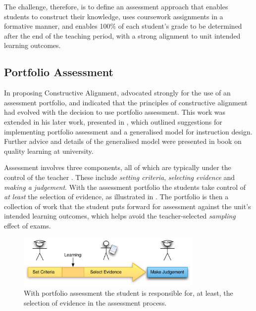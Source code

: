 The challenge, therefore, is to define an assessment approach that enables students to construct their knowledge, uses coursework assignments in a formative manner, and enables 100\% of each student's grade to be determined after the end of the teaching period, with a strong alignment to unit intended learning outcomes.

\clearpage
\subsection{Portfolio Assessment} %
\label{sub:portfolio_assessment}

In proposing Constructive Alignment, \citet{Biggs:1996c} advocated strongly for the use of an assessment portfolio, and indicated that the principles of constructive alignment had evolved with the decision to use portfolio assessment. This work was extended in his later work, presented in \cite{Biggs:1997}, which outlined suggestions for implementing portfolio assessment and a generalised model for instruction design. Further advice and details of the generalised model were presented in \citet{Biggs:2007} book on quality learning at university.

Assessment involves three components, all of which are typically under the control of the teacher \cite{Biggs:1997}. These include \emph{setting criteria}, \emph{selecting evidence} and \emph{making a judgement}. With the assessment portfolio the students take control of \emph{at least} the selection of evidence, as illustrated in . The portfolio is then a collection of work that the student puts forward for assessment against the unit's intended learning outcomes, which helps avoid the teacher-selected \emph{sampling} effect of exams.

\begin{figure}[htbp]
	\centering
	\includegraphics[width=0.8\textwidth]{SelectEvidence}
	\caption{With portfolio assessment the student is responsible for, at least, the selection of evidence in the assessment process.}
	\label{fig:select_evidence}
\end{figure}

%
% 


